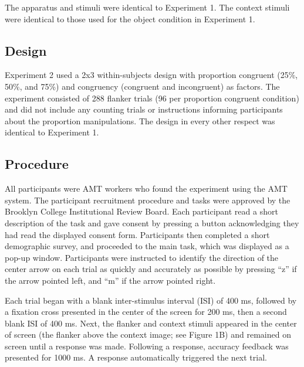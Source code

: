\documentclass[english,,man,floatsintext]{apa6}
\begin{document}
The apparatus and stimuli were identical to Experiment 1. The context stimuli were identical to those used for the object condition in Experiment 1.

\hypertarget{design-1}{%
\subsection{Design}\label{design-1}}

Experiment 2 used a 2x3 within-subjects design with proportion congruent (25\%, 50\%, and 75\%) and congruency (congruent and incongruent) as factors. The experiment consisted of 288 flanker trials (96 per proportion congruent condition) and did not include any counting trials or instructions informing participants about the proportion manipulations. The design in every other respect was identical to Experiment 1.

\hypertarget{procedure-1}{%
\subsection{Procedure}\label{procedure-1}}

All participants were AMT workers who found the experiment using the AMT system. The participant recruitment procedure and tasks were approved by the Brooklyn College Institutional Review Board. Each participant read a short description of the task and gave consent by pressing a button acknowledging they had read the displayed consent form. Participants then completed a short demographic survey, and proceeded to the main task, which was displayed as a pop-up window. Participants were instructed to identify the direction of the center arrow on each trial as quickly and accurately as possible by pressing \enquote{z} if the arrow pointed left, and \enquote{m} if the arrow pointed right.

Each trial began with a blank inter-stimulus interval (ISI) of 400 ms, followed by a fixation cross presented in the center of the screen for 200 ms, then a second blank ISI of 400 ms. Next, the flanker and context stimuli appeared in the center of screen (the flanker above the context image; see Figure 1B) and remained on screen until a response was made. Following a response, accuracy feedback was presented for 1000 ms. A response automatically triggered the next trial.
\end{document}
